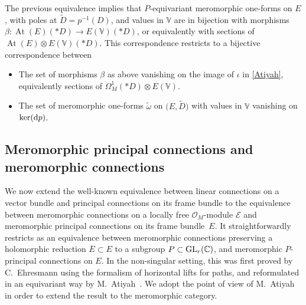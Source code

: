 \documentclass[10pt,a4paper]{amsart}
\numberwithin{equation}{section}
\begin{document}
The previous equivalence implies that $P$-equivariant meromorphic one-forms on $E$, with poles at $\tilde{D}=p^{-1}(D)$, and values in $\mathbb{V}$ are in bijection with morphisms $\beta\colon \operatorname{At}(E)(* D) \longrightarrow E(\mathbb{V})(* D)$, or equivalently with sections of $\operatorname{At}(E) \otimes E(\mathbb{V})(* D)$. This correspondence restricts to a bijective correspondence between
 \begin{itemize}\itemsep=0pt
 \item[$\bullet$] The set of morphisms $\beta$ as above vanishing on the image of $\iota$ in \eqref{Atiyah}, equivalently sections of $\Omega^1_M(* D) \otimes E(\mathbb{V})$.
 \item[$\bullet$] The set of meromorphic one-forms $\tilde{\omega}$ on $\big(E,\tilde{D}\big)$ with values in $\mathbb{V}$ vanishing on $\ker({\rm d}p)$. \end{itemize}

\subsection{Meromorphic principal connections and meromorphic connections}\label{sectionprincipale}

We now extend the well-known equivalence between linear connections on a vector bundle and principal connections on its frame bundle to the equivalence between meromorphic connections on a locally free $\mathcal{O}_M$-module $\mathcal{E}$ and meromorphic principal connections on its frame bundle~$E$. It straightforwardly restricts as an equivalence between meromorphic connections preserving a holomorphic reduction $\overline{E}\subset E$ to a subgroup $P\subset {\rm GL}_r(\mathbb{C})$, and meromorphic $P$-principal connections on $E$. In the non-singular setting, this was first proved by C.~Ehresmann \cite{Erhesmanh} using the formalism of horizontal lifts for paths, and reformulated in an equivariant way by M.~Atiyah~\cite{Atiyah}. We adopt the point of view of M.~Atiyah in order to extend the result to the meromorphic category.
\end{document}
